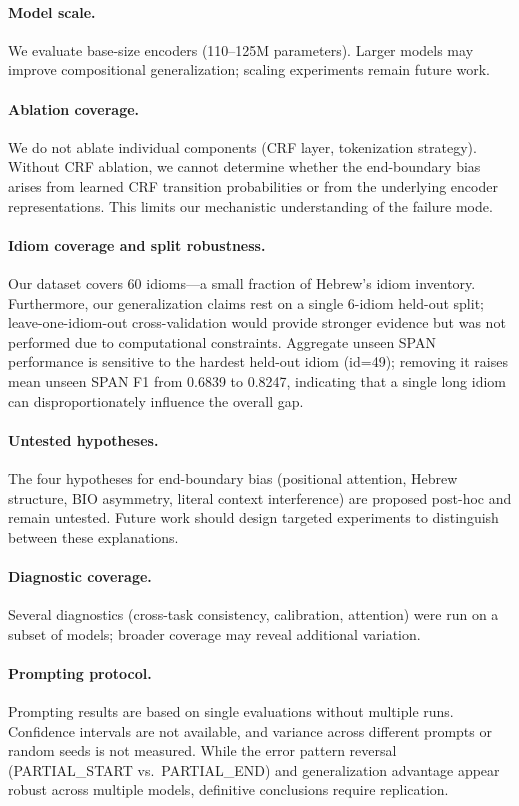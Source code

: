 \documentclass[11pt]{article}
\begin{document}
\paragraph{Model scale.}
We evaluate base-size encoders (110--125M parameters). Larger models may improve compositional generalization; scaling experiments remain future work.

\paragraph{Ablation coverage.}
We do not ablate individual components (CRF layer, tokenization strategy). Without CRF ablation, we cannot determine whether the end-boundary bias arises from learned CRF transition probabilities or from the underlying encoder representations. This limits our mechanistic understanding of the failure mode.

\paragraph{Idiom coverage and split robustness.}
Our dataset covers 60 idioms---a small fraction of Hebrew's idiom inventory. Furthermore, our generalization claims rest on a single 6-idiom held-out split; leave-one-idiom-out cross-validation would provide stronger evidence but was not performed due to computational constraints. Aggregate unseen SPAN performance is sensitive to the hardest held-out idiom (id=49); removing it raises mean unseen SPAN F1 from 0.6839 to 0.8247, indicating that a single long idiom can disproportionately influence the overall gap.

\paragraph{Untested hypotheses.}
The four hypotheses for end-boundary bias (positional attention, Hebrew structure, BIO asymmetry, literal context interference) are proposed post-hoc and remain untested. Future work should design targeted experiments to distinguish between these explanations.

\paragraph{Diagnostic coverage.}
Several diagnostics (cross-task consistency, calibration, attention) were run on a subset of models; broader coverage may reveal additional variation.

\paragraph{Prompting protocol.}
Prompting results are based on single evaluations without multiple runs. Confidence intervals are not available, and variance across different prompts or random seeds is not measured. While the error pattern reversal (PARTIAL\_START vs.\ PARTIAL\_END) and generalization advantage appear robust across multiple models, definitive conclusions require replication.
\end{document}
